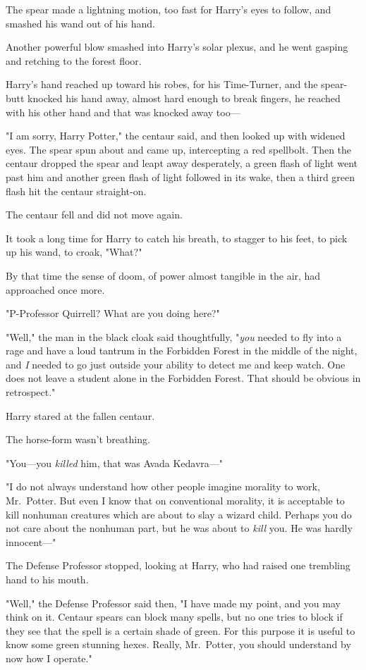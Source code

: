 The spear made a lightning motion, too fast for Harry's eyes to follow, and
smashed his wand out of his hand.

Another powerful blow smashed into Harry's solar plexus, and he went gasping
and retching to the forest floor.

Harry's hand reached up toward his robes, for his Time-Turner, and the
spear-butt knocked his hand away, almost hard enough to break fingers, he
reached with his other hand and that was knocked away too---

"I am sorry, Harry Potter," the centaur said, and then looked up with widened
eyes. The spear spun about and came up, intercepting a red spellbolt. Then the
centaur dropped the spear and leapt away desperately, a green flash of light
went past him and another green flash of light followed in its wake, then a
third green flash hit the centaur straight-on.

The centaur fell and did not move again.

It took a long time for Harry to catch his breath, to stagger to his feet, to
pick up his wand, to croak, "What?"

By that time the sense of doom, of power almost tangible in the air, had
approached once more.

"P-Professor Quirrell? What are you doing here?"

"Well," the man in the black cloak said thoughtfully, "\emph{you} needed to fly
into a rage and have a loud tantrum in the Forbidden Forest in the middle of
the night, and \emph{I} needed to go just outside your ability to detect me and
keep watch. One does not leave a student alone in the Forbidden Forest. That
should be obvious in retrospect."

Harry stared at the fallen centaur.

The horse-form wasn't breathing.

"You---you \emph{killed} him, that was Avada Kedavra\mbox{---}"

"I do not always understand how other people imagine morality to work,
Mr.~Potter. But even I know that on conventional morality, it is acceptable to
kill nonhuman creatures which are about to slay a wizard child. Perhaps you do
not care about the nonhuman part, but he was about to \emph{kill} you. He was
hardly innocent\mbox{---}"

The Defense Professor stopped, looking at Harry, who had raised one trembling
hand to his mouth.

"Well," the Defense Professor said then, "I have made my point, and you may
think on it. Centaur spears can block many spells, but no one tries to block if
they see that the spell is a certain shade of green. For this purpose it is
useful to know some green stunning hexes. Really, Mr.~Potter, you should
understand by now how I operate."

